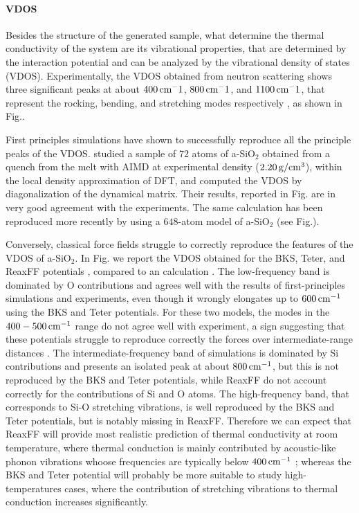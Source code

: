 \paragraph{VDOS}
Besides the structure of the generated sample, what determine the thermal conductivity of the system are its vibrational properties, that are determined by the interaction potential and can be analyzed by the vibrational density of states (VDOS).
Experimentally, the VDOS obtained from neutron scattering shows three significant peaks at about $400\,\mathrm{cm^-1}$, $800\,\mathrm{cm^-1}$, and $1100\,\mathrm{cm^-1}$, that represent the rocking, bending, and stretching modes respectively \cite{Galeener1983}, as shown in Fig..

First principles simulations have shown to successfully reproduce all the principle peaks of the VDOS. \citet{Sarnthein1997} studied a sample of $72$ atoms of a-SiO$_2$ obtained from a quench from the melt with AIMD at experimental density ($2.20\,\mathrm{g/cm^3}$), within the local density approximation of DFT, and computed the VDOS by diagonalization of the dynamical matrix. Their results, reported in Fig. are in very good agreement with the experiments. The same calculation has been reproduced more recently by \citet{Bhattarai2016} using a $648$-atom model of a-SiO$_2$ (see Fig.).

Conversely, classical force fields struggle to correctly reproduce the features of the VDOS of a-SiO$_2$. In Fig. we report the VDOS obtained for the BKS, Teter, and ReaxFF potentials \cite{Tian2017}, compared to an \abinitio calculation \cite{Bhattarai2016}. 
The low-frequency band is dominated by O contributions and agrees well with the results of first-principles simulations and experiments, even though it wrongly elongates up to $600\,\mathrm{cm^{-1}}$ using the BKS and Teter potentials. For these two models, the modes in the $400-500\,\mathrm{cm^{-1}}$ range do not agree well with experiment, a sign suggesting that these potentials struggle to reproduce correctly the forces over intermediate-range distances \cite{Vollmayr1996}. 
The intermediate-frequency band of \abinitio simulations is dominated by Si contributions and presents an isolated peak at about $800\,\mathrm{cm^{-1}}$, but this is not reproduced by the BKS and Teter potentials, while ReaxFF do not account correctly for the contributions of Si and O atoms. 
The high-frequency band, that corresponds to Si-O stretching vibrations, is well reproduced by the BKS and Teter potentials, but is notably missing in ReaxFF. 
Therefore we can expect that ReaxFF will provide most realistic prediction of thermal conductivity at room temperature, where thermal conduction is mainly contributed by acoustic-like phonon vibrations whoose frequencies are typically below $400\,\mathrm{cm^{-1}}$ \cite{Bhattarai2016}; whereas the BKS and Teter potential will probably be more suitable to study high-temperatures cases, where the contribution of stretching vibrations to thermal conduction increases significantly. 


